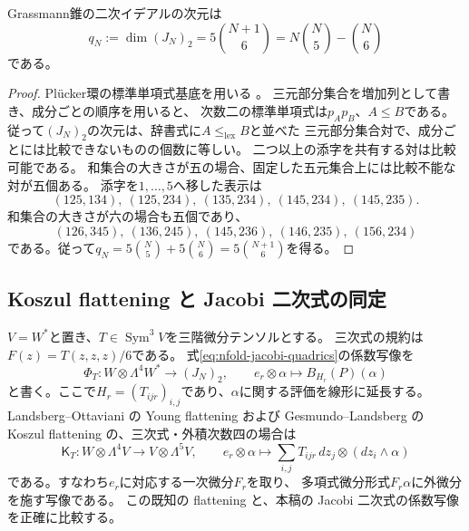 \begin{lemma}\label{lem:nfold-plucker-count}
Grassmann錐の二次イデアルの次元は
\begin{equation}\label{eq:nfold-plucker-count}
 q_N:=\dim(J_N)_2
 =5\binom{N+1}{6}=N\binom N5-\binom N6
\end{equation}
である。
\end{lemma}
\begin{proof}
Pl\"ucker環の標準単項式基底を用いる
\cite[\S2.4, Theorem~2.3]{BCMStandardMonomial}。
三元部分集合を増加列として書き、成分ごとの順序を用いると、
次数二の標準単項式は$p_Ap_B$、$A\le B$である。
従って$(J_N)_2$の次元は、辞書式に$A\le_{\mathrm{lex}}B$と並べた
三元部分集合対で、成分ごとには比較できないものの個数に等しい。
二つ以上の添字を共有する対は比較可能である。
和集合の大きさが五の場合、固定した五元集合上には比較不能な対が五個ある。
添字を$1,\ldots,5$へ移した表示は
\[
 (125,134),\ (125,234),\ (135,234),\ (145,234),\ (145,235).
\]
和集合の大きさが六の場合も五個であり、
\[
 (126,345),\ (136,245),\ (145,236),\ (146,235),\ (156,234)
\]
である。従って$q_N=5\binom N5+5\binom N6=5\binom{N+1}{6}$を得る。
\end{proof}

\subsection{Koszul flattening と Jacobi 二次式の同定}

$V=W^*$と置き、$T\in\operatorname{Sym}^3V$を三階微分テンソルとする。
三次式の規約は$F(z)=T(z,z,z)/6$である。
式\eqref{eq:nfold-jacobi-quadrics}の係数写像を
\[
 \Phi_T:W\otimes\Lambda^4W^*\longrightarrow (J_N)_2,
 \qquad e_r\otimes\alpha\longmapsto B_{H_r}(P)(\alpha)
\]
と書く。ここで$H_r=(T_{ijr})_{i,j}$であり、$\alpha$に関する評価を線形に延長する。
Landsberg--Ottaviani の Young flattening
\cite[\S1.2, (2); \S4.1, Remark~4.1.3]{LandsbergOttavianiYoung}
および Gesmundo--Landsberg の Koszul flattening
\cite[\S6]{GesmundoLandsbergPartials}の、三次式・外積次数四の場合は
\[
 \mathsf K_T:W\otimes\Lambda^4V\longrightarrow V\otimes\Lambda^5V,
 \qquad
 e_r\otimes\alpha\longmapsto
 \sum_{i,j}T_{ijr}\,dz_j\otimes(dz_i\wedge\alpha)
\]
である。すなわち$e_r$に対応する一次微分$F_r$を取り、
多項式微分形式$F_r\alpha$に外微分を施す写像である。
この既知の flattening と、本稿の Jacobi 二次式の係数写像を正確に比較する。


